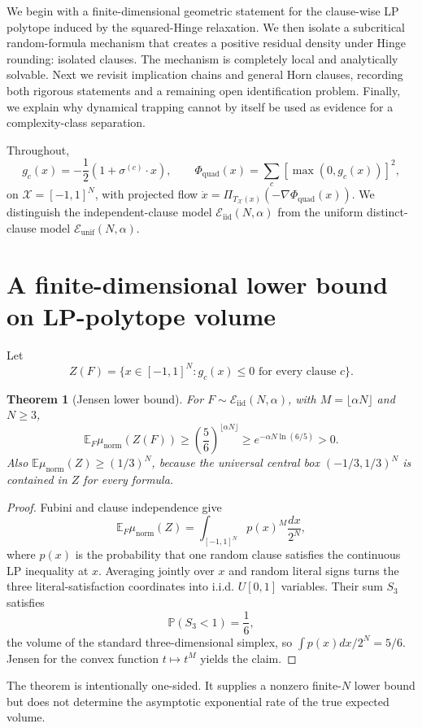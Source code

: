 \documentclass[11pt,a4paper]{article}
\newtheorem{theorem}{Theorem}[section]
\begin{document}
We begin with a finite-dimensional geometric statement for the clause-wise LP polytope induced by the squared-Hinge relaxation. We then isolate a subcritical random-formula mechanism that creates a positive residual density under Hinge rounding: isolated clauses. The mechanism is completely local and analytically solvable. Next we revisit implication chains and general Horn clauses, recording both rigorous statements and a remaining open identification problem. Finally, we explain why dynamical trapping cannot by itself be used as evidence for a complexity-class separation.

Throughout,
\[
g_c(x)=-\frac12(1+\sigma^{(c)}\cdot x),
\qquad
\Phi_{\mathrm{quad}}(x)=\sum_c[\max(0,g_c(x))]^2,
\]
on $\mathcal X=[-1,1]^N$, with projected flow $\dot x=\Pi_{T_{\mathcal X}(x)}(-\nabla\Phi_{\mathrm{quad}}(x))$. We distinguish the independent-clause model $\mathcal E_{\mathrm{iid}}(N,\alpha)$ from the uniform distinct-clause model $\mathcal E_{\mathrm{unif}}(N,\alpha)$.

\section{A finite-dimensional lower bound on LP-polytope volume}
Let
\[
Z(F)=\{x\in[-1,1]^N:g_c(x)\le0\text{ for every clause }c\}.
\]
\begin{theorem}[Jensen lower bound]
For $F\sim\mathcal E_{\mathrm{iid}}(N,\alpha)$, with $M=\lfloor\alpha N\rfloor$ and $N\ge3$,
\[
\mathbb E_F\mu_{\mathrm{norm}}(Z(F))
\ge\left(\frac56\right)^{\lfloor\alpha N\rfloor}
\ge e^{-\alpha N\ln(6/5)}>0.
\]
Also $\mathbb E\mu_{\mathrm{norm}}(Z)\ge(1/3)^N$, because the universal central box $(-1/3,1/3)^N$ is contained in $Z$ for every formula.
\end{theorem}
\begin{proof}
Fubini and clause independence give
\[
\mathbb E_F\mu_{\mathrm{norm}}(Z)
=\int_{[-1,1]^N}p(x)^M\frac{dx}{2^N},
\]
where $p(x)$ is the probability that one random clause satisfies the continuous LP inequality at $x$. Averaging jointly over $x$ and random literal signs turns the three literal-satisfaction coordinates into i.i.d. $U[0,1]$ variables. Their sum $S_3$ satisfies
\[
\mathbb P(S_3<1)=\frac16,
\]
the volume of the standard three-dimensional simplex, so $\int p(x)dx/2^N=5/6$. Jensen for the convex function $t\mapsto t^M$ yields the claim.
\end{proof}

The theorem is intentionally one-sided. It supplies a nonzero finite-$N$ lower bound but does not determine the asymptotic exponential rate of the true expected volume.
\end{document}
